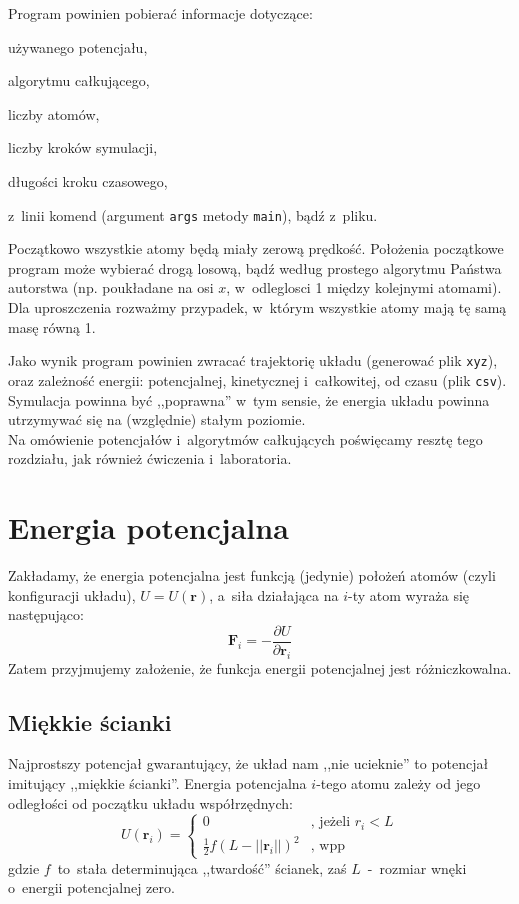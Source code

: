 \documentclass[a4paper,11pt,twoside]{book}
\newenvironment{packed_enum}{
\begin{enumerate}
  \setlength{\itemsep}{1pt}
  \setlength{\parskip}{0pt}
  \setlength{\parsep}{0pt}
}{\end{enumerate}}
\begin{document}
Program powinien pobierać informacje dotyczące:
\begin{packed_enum}
\item używanego potencjału,
\item algorytmu całkującego, 
\item liczby atomów,
\item liczby kroków symulacji,
\item długości kroku czasowego,
\end{packed_enum}
z~linii komend (argument \texttt{args} metody \texttt{main}), bądź z~pliku.

Początkowo wszystkie atomy będą miały zerową prędkość. Położenia początkowe program może wybierać drogą losową, bądź według prostego algorytmu Państwa autorstwa (np. poukładane na osi $x$, w~odleglosci 1 między kolejnymi atomami). Dla uproszczenia rozważmy przypadek, w~którym wszystkie atomy mają tę samą masę równą 1.

Jako wynik program powinien zwracać trajektorię układu (generować plik \texttt{xyz}), oraz zależność energii: potencjalnej, kinetycznej i~całkowitej, od czasu (plik \texttt{csv}). Symulacja powinna być ,,poprawna'' w~tym sensie, że energia układu powinna utrzymywać się na (względnie) stałym poziomie. \\

Na omówienie potencjałów i~algorytmów całkujących poświęcamy resztę tego rozdziału, jak również ćwiczenia i~laboratoria.
\section{Energia potencjalna}
Zakładamy, że energia potencjalna jest funkcją (jedynie) położeń atomów (czyli konfiguracji układu), $U=U(\mathbf{r})$, a~siła działająca na $i$-ty atom wyraża się następująco:
\begin{displaymath}
\mathbf{F}_i = -\frac{\partial U}{\partial \mathbf{r}_i}
\end{displaymath}
Zatem przyjmujemy założenie, że funkcja energii potencjalnej jest różniczkowalna.
\subsection{Miękkie ścianki}
Najprostszy potencjał gwarantujący, że układ nam ,,nie ucieknie'' to potencjał imitujący ,,miękkie ścianki''. Energia potencjalna $i$-tego atomu zależy od jego odległości od początku układu współrzędnych:
\begin{displaymath}
U(\mathbf{r}_i) = \left\{ \begin{array}{ll}
0 & \textrm{, jeżeli $r_i<L$}\\
\frac{1}{2}f(L-||\mathbf{r}_i||)^2 & \textrm{, wpp}
\end{array} \right.
\end{displaymath}
gdzie $f$~to~stała determinująca ,,twardość'' ścianek, zaś $L$~-~rozmiar wnęki o~energii potencjalnej zero.
\end{document}
